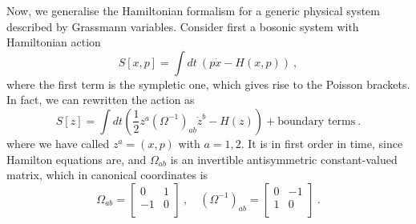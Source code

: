     Now, we generalise the Hamiltonian formalism for a generic physical system described by Grassmann variables. Consider first a bosonic system with Hamiltonian action
    \begin{equation*}
        S[x, p] = \int dt ~ (p \dot x - H(x, p)) ~,
    \end{equation*}
    where the first term is the sympletic one, which gives rise to the Poisson brackets. In fact, we can rewritten the action as 
    \begin{equation*}
        S[z] = \int dt (\frac{1}{2} z^a (\Omega^{-1})_{ab} \dot z^b - H(z)) + \text{boundary terms} ~.
    \end{equation*}
    where we have called $z^a = (x, p)$ with $a = 1,2$. It is in first order in time, since Hamilton equations are, and $\Omega_{ab}$ is an invertible antisymmetric constant-valued matrix, which in canonical coordinates is 
    \begin{equation*}
        \Omega_{ab} = \begin{bmatrix}
            0 & 1  \\ -1 & 0 \\
        \end{bmatrix} ~, \quad (\Omega^{-1})_{ab} = \begin{bmatrix}
            0 & -1  \\ 1 & 0 \\
        \end{bmatrix} ~.
    \end{equation*}
